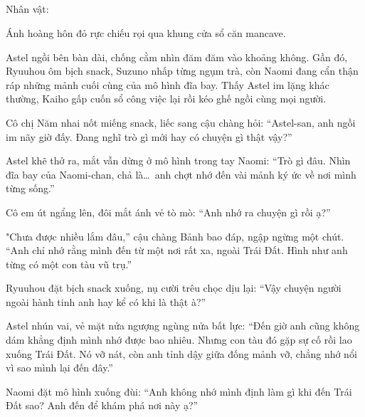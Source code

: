 \documentclass[../main.tex]{subfiles}
\begin{document}
\newpage

\omk

\subsection*{\label{ep-M34.VI}}
\vspace{-4pt}
\begin{center}
    {\caviar\fontsize{12pt}{12pt}\selectfont Nhân vật:      }
\end{center}

Ánh hoàng hôn đỏ rực chiếu rọi qua khung cửa sổ căn mancave.

Astel ngồi bên bàn dài, chống cằm nhìn đăm đăm vào khoảng không. Gần đó, Ryuuhou ôm bịch snack, Suzuno nhấp từng ngụm trà, còn Naomi đang cẩn thận ráp những mảnh cuối cùng của mô hình đĩa bay. Thấy Astel im lặng khác thường, Kaiho gấp cuốn sổ công việc lại rồi kéo ghế ngồi cùng mọi người.

Cô chị Năm nhai nốt miếng snack, liếc sang cậu chàng hỏi: ``Astel-san, anh ngồi im nãy giờ đấy. Đang nghĩ trò gì mới hay có chuyện gì thật vậy?''

Astel khẽ thở ra, mắt vẫn dừng ở mô hình trong tay Naomi: ``Trò gì đâu. Nhìn đĩa bay của Naomi-chan, chả là\dots\ anh chợt nhớ đến vài mảnh ký ức về nơi mình từng sống.''

Cô em út ngẩng lên, đôi mắt ánh vẻ tò mò: ``Anh nhớ ra chuyện gì rồi ạ?''

"Chưa được nhiều lắm đâu,'' cậu chàng Bảnh bao đáp, ngập ngừng một chút. ``Anh chỉ nhớ rằng mình đến từ một nơi rất xa, ngoài Trái Đất. Hình như anh từng có một con tàu vũ trụ.''

Ryuuhou đặt bịch snack xuống, nụ cười trêu chọc dịu lại: ``Vậy chuyện người ngoài hành tinh anh hay kể có khi là thật à?''

Astel nhún vai, vẻ mặt nửa ngượng ngùng nửa bất lực: ``Đến giờ anh cũng không dám khẳng định mình nhớ được bao nhiêu. Nhưng con tàu đó gặp sự cố rồi lao xuống Trái Đất. Nó vỡ nát, còn anh tỉnh dậy giữa đống mảnh vỡ, chẳng nhớ nổi vì sao mình lại đến đây.''

Naomi đặt mô hình xuống đùi: ``Anh không nhớ mình định làm gì khi đến Trái Đất sao? Anh đến để khám phá nơi này ạ?''
\end{document}
